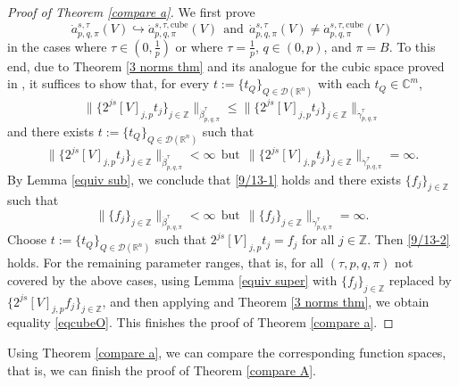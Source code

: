 \documentclass[11pt, reqno]{amsart}
\theoremstyle{definition}
\theoremstyle{remark}
\numberwithin{equation}{section}
\newcommand{\Z}{\mathbb Z}
\begin{document}
\begin{proof}[Proof of Theorem \ref{compare a}]
We first prove
$$
\dot a^{s,\tau}_{p,q,\pi}(V)
\hookrightarrow
\dot a^{s,\tau,\mathrm{cube}}_{p,q,\pi}(V)
\ \ \text{and}\ \
\dot a^{s,\tau}_{p,q,\pi}(V)
\neq \dot a^{s,\tau,\mathrm{cube}}_{p,q,\pi}(V)
$$
in the cases where $\tau\in(0,\frac 1p)$ or where $\tau=\frac 1p$,
$q\in (0,p)$, and $\pi=B$.
To this end, due to Theorem \ref{3 norms thm} and its analogue for the cubic space proved in \cite[Theorem 3.27]{BHYY:1a}, it suffices to show that,
for every $t:=\{t_Q\}_{Q\in\mathscr D(\mathbb R^n)}$ with each $t_Q\in\mathbb C^m$,
\begin{equation}\label{9/13-1}
\|\{2^{js} [V]_{j,p} t_j\}_{j\in\mathbb Z}\|_{\dot\beta^\tau_{p,q,\pi}}
\leq\|\{2^{js} [V]_{j,p} t_j\}_{j\in\mathbb Z}\|_{\dot\gamma^\tau_{p,q,\pi}}
\end{equation}
and there exists $t:=\{t_Q\}_{Q\in\mathscr D(\mathbb R^n)}$ such that
\begin{equation}\label{9/13-2}
\|\{2^{js} [V]_{j,p} t_j\}_{j\in\mathbb Z}\|_{\dot\beta^\tau_{p,q,\pi}}<\infty
\ \ \text{but}\ \
\|\{2^{js} [V]_{j,p} t_j\}_{j\in\mathbb Z}\|_{\dot\gamma^\tau_{p,q,\pi}}=\infty.
\end{equation}
By Lemma \ref{equiv sub}, we conclude that
\eqref{9/13-1} holds and there exists $\{f_j\}_{j\in\mathbb Z}$ such that
$$
\|\{f_j\}_{j\in\mathbb Z}\|_{\dot\beta^\tau_{p,q,\pi}}<\infty
\ \ \text{but}\ \
\|\{f_j\}_{j\in\mathbb Z}\|_{\dot\gamma^\tau_{p,q,\pi}}=\infty.
$$
Choose $t:=\{t_Q\}_{Q\in\mathscr D(\mathbb R^n)}$ such that
$2^{js} [V]_{j,p} t_j=f_j$ for all $j\in\mathbb Z$.
Then \eqref{9/13-2} holds.
For the remaining parameter ranges, that is, for all
$(\tau,p,q,\pi)$ not covered by the above cases,
using Lemma \ref{equiv super} with $\{f_j\}_{j\in\Z}$ replaced by
$\{2^{js}[V]_{j,p}f_{j}\}_{j\in\Z}$,
and then applying \cite[Theorem 3.27]{BHYY:1a} and Theorem \ref{3 norms thm},
we obtain equality \eqref{eqcubeO}.
This finishes the proof of Theorem \ref{compare a}.
\end{proof}

Using Theorem \ref{compare a}, we can
compare the corresponding function spaces, that is,
we can finish the proof of Theorem \ref{compare A}.
\end{document}

